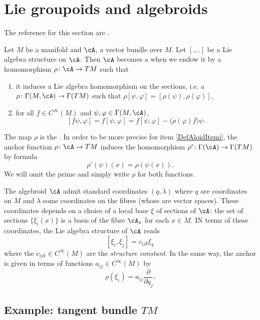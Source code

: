 \section{Lie groupoids and algebroids}
The reference for this section are \cite{WeinGroupoids,WeinGpoidsSymple}.

Let $M$ be a manifold and $\cA$, a vector bundle over $M$. Let $[.,.]$ be a Lie algebra structure on $\cA$. Then $\cA$ becomes a  when we endow it by a homomorphism $\rho\colon \cA\to TM$ such that
\begin{enumerate}
\item\label{DefAloidItemi} it induces a Lie algebra homomorphism on the sections, i.e. a $\rho\colon \Gamma(M,\cA)\to \Gamma(TM)$ such that $\rho[\psi,\varphi]=[\rho(\psi),\rho(\varphi)]$,
\item for all $f\in C^{\infty}(M)$ and $\psi,\varphi\in\Gamma(M,\cA)$,
\begin{equation}  \label{DefAlgoidCondc}
[f\psi,\varphi]=f[\psi,\varphi]=f[\psi,\varphi]-\big( \rho(\varphi)f \big)\psi.
\end{equation}

\end{enumerate}
The map $\rho$ is the . In order to be more precise for item \ref{DefAloidItemi}, the anchor function $\rho\colon \cA\to TM$ induces the homomorphism  $\rho'\colon \Gamma(\cA)\to \Gamma(TM)$ by formula
\begin{equation}  \label{EqInduitAncra} 
  \rho'(\psi)(x)=\rho(\psi(x)).
\end{equation}
We will omit the prime and simply write $\rho$ for both functions.

The algebroid $\cA$ admit standard coordinates\label{PgStandCoord} $(q,\lambda)$ where $q$ are coordinates on $M$ and $\lambda$ some coordinates on the fibres (whose are vector spaces). These coordinates depends on a choice of a local base $\xi$ of sections of $\cA$: the set of sections $\{\xi_{i}(x)\}$ is a basis of the fibre $\cA_{x}$ for each $x\in M$. IN terms of these coordinates, the Lie algebra structure of $\cA$ reads
\[ 
  [\xi_{i},\xi_{j}]=c_{ijk}\xi_{k}
\]
where the $c_{ijk}\in C^{\infty}(M)$ are the \emph{structure constant}. In the same way, the anchor is given in terms of functions $a_{ij}\in C^{\infty}(M)$ by
\[ 
  \rho(\xi_{i})=a_{ij}\frac{ \partial }{ \partial q_{j} }.
\]

\subsection{Example: tangent bundle \texorpdfstring{$TM$}{TM}}

